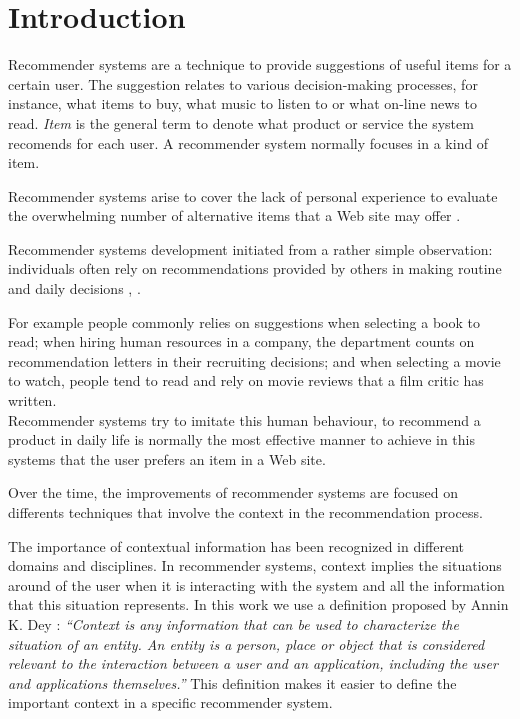 \chapter{Introduction} \label{introduction} 

Recommender systems are a technique to provide suggestions of 
useful items for a certain user. The suggestion relates to various
decision-making processes, for instance, what items to buy, what music
to listen to or what on-line news to read. \textit{Item} is the general
term to denote what product or service  the system recomends for each
user. A recommender system normally focuses in a kind of item.

Recommender systems arise to cover the lack of personal experience to
evaluate the overwhelming number of alternative items that a Web site
may offer \cite{resnick1997recommender}.

Recommender systems development initiated from a rather simple
observation: individuals often rely on recommendations provided by
others in making routine and daily decisions \cite{mahmood2009improving},
\cite{mcsherry2009differentially}. 

For example people commonly relies on suggestions when selecting a
book to read; when hiring human resources in a company, the department
counts on recommendation letters in their recruiting decisions; and
when selecting a movie to watch, people tend to read and rely on 
movie reviews that a film critic has written.\\


Recommender systems try to imitate this human behaviour, to
recommend a product in daily life is normally the most effective
manner to achieve in this systems that the user prefers an item in a
Web site.

Over the time, the improvements of recommender systems are
focused on differents techniques that involve the context in the
recommendation process. 

The importance of contextual information has
been recognized in different domains and disciplines. %
In recommender
systems, context implies the situations around of the user when it is %
interacting with the system and all the information that this
situation represents. 
In this work we use a definition proposed by Annin K.
Dey \cite{dey2001understanding}: \textit{``Context is any information
that can be used to characterize the situation of an entity. An entity
is a person, place or object that is considered relevant to the
interaction between a user and an application, including the user and
applications themselves.''} 
This definition makes it easier to define
the important context in a specific recommender system.\\  %

